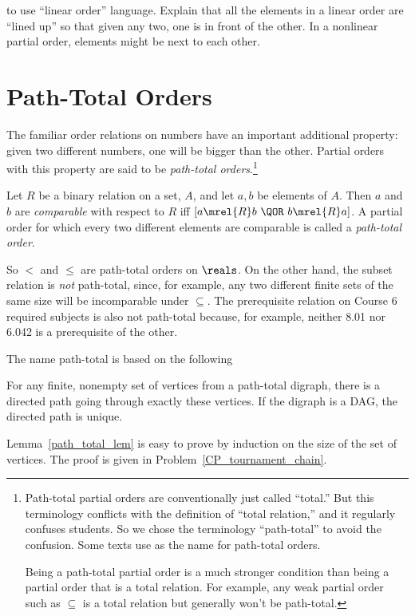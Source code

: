 \begin{definition}
\begin{problems}
\end{problems}


\begin{editingnotes}
 to use ``linear order'' language.  Explain that all the
elements in a linear order are ``lined up'' so that given any two, one
is in front of the other.  In a nonlinear partial order, elements
might be next to each other.
\end{editingnotes}

\section{Path-Total Orders}

The familiar order relations on numbers have an important additional
property: given two different numbers, one will be bigger than the
other.  Partial orders with this property are said to be
\emph{path-total orders}.\footnote{Path-total partial orders are
  conventionally just called ``total.''  But this terminology
  conflicts with the definition of ``total relation,'' and it
  regularly confuses students.  So we chose the terminology
  ``path-total'' to avoid the confusion.  Some texts use  as the name for path-total orders.

  Being a path-total partial order is a much stronger condition than
  being a partial order that is a total relation.  For example, any
  weak partial order such as $\subseteq$ is a total relation but
  generally won't be path-total.}

\begin{definition}
Let $R$ be a binary relation on a set, $A$, and let $a, b$ be elements of
$A$.  Then $a$ and $b$ are \emph{comparable} with respect to $R$ iff $[a
  \mrel{R} b\ \QOR\ b \mrel{R} a]$.  A partial order for which every two
different elements are comparable is called a \emph{path-total order}.
\end{definition}

So $<$ and $\le$ are path-total orders on $\reals$.  On the other hand, the
subset relation is \emph{not} path-total, since, for example, any two different
finite sets of the same size will be incomparable under $\subseteq$.  The
prerequisite relation on Course 6 required subjects is also not path-total
because, for example, neither 8.01 nor 6.042 is a prerequisite of the
other.

The name path-total is based on the following
\begin{lemma}\label{path_total_lem} For any
  finite, nonempty set of vertices from a path-total digraph, there is
  a directed path going through exactly these vertices.  If
  the digraph is a DAG, the directed path is unique.
\end{lemma}
Lemma~\ref{path_total_lem} is easy to prove by induction on the size
of the set of vertices.  The proof is given in
Problem~\ref{CP_tournament_chain}.


\end{definition}
